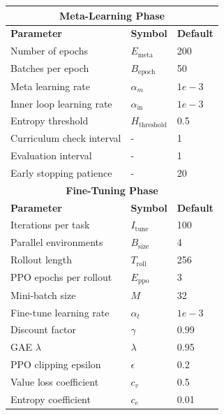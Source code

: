 \documentclass[11pt,a4paper]{article}
\begin{document}
\begin{center}
\begin{tabular}{|l|l|l|}
\hline
\multicolumn{3}{|c|}{\textbf{Meta-Learning Phase}} \\
\hline
\textbf{Parameter} & \textbf{Symbol} & \textbf{Default} \\
\hline
Number of epochs & $E_{\text{meta}}$ & 200 \\
Batches per epoch & $B_{\text{epoch}}$ & 50 \\
Meta learning rate & $\alpha_m$ & $1e-3$ \\
Inner loop learning rate & $\alpha_{\text{in}}$ & $1e-3$ \\
Entropy threshold & $H_{\text{threshold}}$ & 0.5 \\
Curriculum check interval & - & 1 \\
Evaluation interval & - & 1 \\
Early stopping patience & - & 20 \\
\hline
\multicolumn{3}{|c|}{\textbf{Fine-Tuning Phase}} \\
\hline
\textbf{Parameter} & \textbf{Symbol} & \textbf{Default} \\
\hline
Iterations per task & $I_{\text{tune}}$ & 100 \\
Parallel environments & $B_{\text{size}}$ & 4 \\
Rollout length & $T_{\text{roll}}$ & 256 \\
PPO epochs per rollout & $E_{\text{ppo}}$ & 3 \\
Mini-batch size & $M$ & 32 \\
Fine-tune learning rate & $\alpha_t$ & $1e-3$ \\
Discount factor & $\gamma$ & 0.99 \\
GAE $\lambda$ & $\lambda$ & 0.95 \\
PPO clipping epsilon & $\epsilon$ & 0.2 \\
Value loss coefficient & $c_v$ & 0.5 \\
Entropy coefficient & $c_e$ & 0.01 \\
\hline
\end{tabular}
\end{center}
\end{document}
